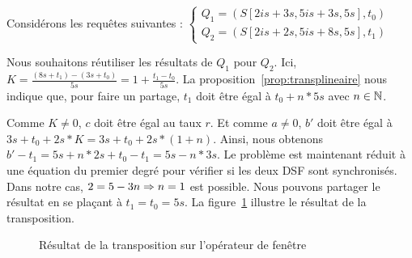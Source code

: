 \begin{example}
    Considérons les requêtes suivantes : $\left\{\begin{array}{l} Q_1=(S[2is+3s, 5is+3s, 5s],t_0)  \\ Q_2=(S[2is+2s, 5is+8s, 5s],t_1) \end{array}\right.$

    Nous souhaitons réutiliser les résultats de $Q_1$ pour $Q_2$. Ici, $K = \frac{(8s+t_1)-(3s+t_0)}{5s} =1+\frac{t_1-t_0}{5s}$. La proposition~\ref{prop:transplineaire} nous indique que, pour faire un partage, $t_1$ doit être égal à $t_0 + n*5s$ avec $n\in \mathbb{N}$.

    Comme $K\neq 0$, $c$ doit être égal au taux $r$. Et comme $a \neq 0$, $b'$ doit être égal à $3s+t_0+2s*K = 3s+t_0+2s*(1+n)$. Ainsi, nous obtenons $b'-t_1 = 5s+n*2s+t_0-t_1 = 5s-n*3s$. Le problème est maintenant réduit à une équation du premier degré pour vérifier si les deux DSF sont synchronisés. Dans notre cas, $2 = 5-3n \Rightarrow n=1$ est possible. Nous pouvons partager le résultat en se plaçant à $t_1 = t_0 = 5s$. La figure~\ref{fig:valid:expressivite:transplineaire} illustre le résultat de la transposition.
\begin{figure}[ht]
\def\lgrad#1{\draw [thick] (#1,0) -- (#1,-0.2); \node [below] at (#1,-0.2){#1};}
\def\seg#1#2#3#4#5{\draw [thick] (#1#40.2,#3+0.25) -- (#1,#3+0.25) -- (#1,#3-0.25) -- (#1#40.2,#3-0.25); \draw [thick] (#1,#3) -- (#2,#3); \draw [thick] (#2#50.2,#3+0.25) -- (#2,#3+0.25) -- (#2,#3-0.25) -- (#2#50.2,#3-0.25);}
\centering
{}
\caption{Résultat de la transposition sur l'opérateur de fenêtre}\label{fig:valid:expressivite:transplineaire}
\end{figure}
\end{example}

